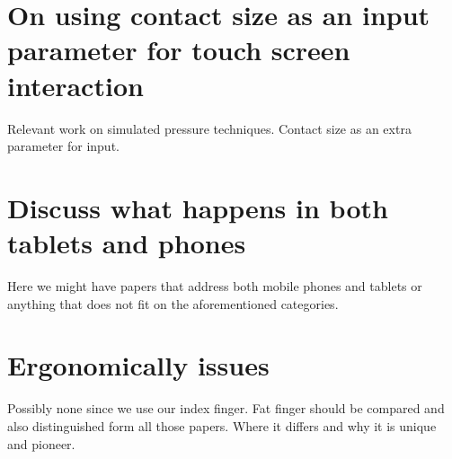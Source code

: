 

\section{On   using   contact   size   as   an   input   parameter   for   touch   screen
interaction}

Relevant work on simulated pressure techniques.  Contact size as an extra parameter
for input. 



\section{Discuss what happens in both tablets and phones}

Here we might have papers that address both mobile phones and tablets or anything
that does not fit on the aforementioned categories.




\section{Ergonomically issues}

Possibly none since we use our index finger.
Fat finger should be compared and also distinguished form all those papers. Where it
differs and why it is unique and pioneer.